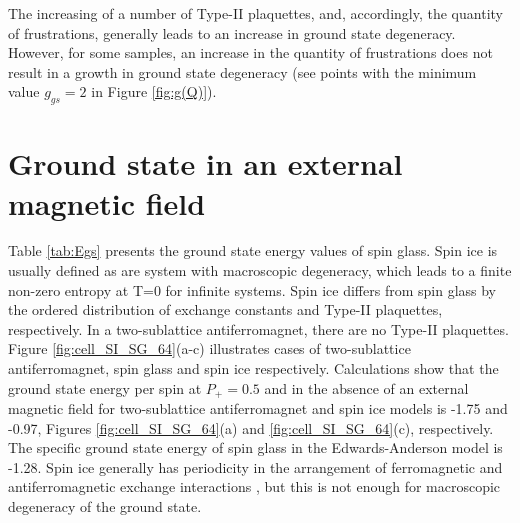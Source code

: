 \documentclass[preprint,12pt]{elsarticle}
\begin{document}
	The increasing of a number of Type-II plaquettes, and, accordingly, the quantity of frustrations, generally leads to an increase in ground state degeneracy. However, for some samples, an increase in the quantity of frustrations does not result in a growth in ground state degeneracy (see points with the minimum value $g_{gs}=2$ in Figure \ref{fig:g(Q)}). 
	
	\section{Ground state in an external magnetic field}
	
	Table \ref{tab:Egs} presents the ground state energy values of spin glass. Spin ice is usually defined as are system with macroscopic degeneracy, which leads to a finite non-zero entropy at T=0 for infinite systems. Spin ice differs from spin glass by the ordered distribution of exchange constants and Type-II plaquettes, respectively. In a two-sublattice antiferromagnet, there are no Type-II plaquettes. Figure \ref{fig:cell_SI_SG_64}(a-c) illustrates cases of two-sublattice antiferromagnet, spin glass and spin ice respectively. Calculations show that the ground state energy per spin at $P_+ = 0.5$ and in the absence of an external magnetic field for two-sublattice antiferromagnet and spin ice models is -1.75 and -0.97, Figures \ref{fig:cell_SI_SG_64}(a) and \ref{fig:cell_SI_SG_64}(c), respectively. The specific ground state energy of spin glass in the Edwards-Anderson model is -1.28. Spin ice generally has periodicity in the arrangement of ferromagnetic and antiferromagnetic exchange interactions \cite{peretyatko2017interplay, otsuka2018husimi, andriushchenko2019large, shevchenko2017effect, kato2022flux}, but this is not enough for macroscopic degeneracy of the ground state. 
	
\end{document}
